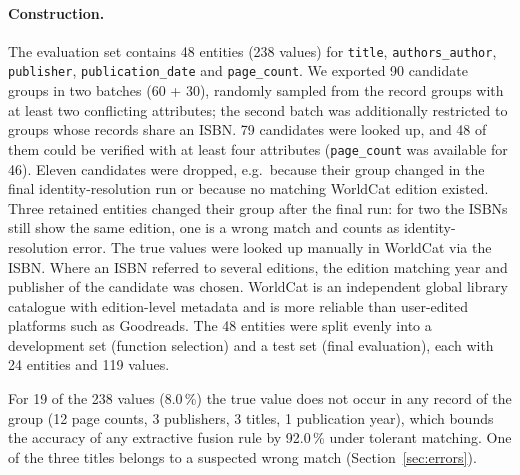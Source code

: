 \documentclass[a4paper,11pt]{article}
\begin{document}
\paragraph{Construction.}
The evaluation set contains 48 entities (238 values) for \texttt{title},
\texttt{authors\_author}, \texttt{publisher}, \texttt{publication\_date} and
\texttt{page\_count}. We exported 90 candidate groups in two batches (60 + 30),
randomly sampled from the record groups with at least two conflicting attributes;
the second batch was additionally restricted to groups whose records share an
ISBN. %
79 candidates were looked up, and 48 of them could be verified with at least four
attributes (\texttt{page\_count} was available for 46). Eleven candidates were
dropped, e.g.\ because their group changed in the final identity-resolution run or
because no matching WorldCat edition existed. Three retained entities
changed their group after the final run: for two the ISBNs still show the same
edition, one is a wrong match and counts as identity-resolution error.
The true values were looked up manually in WorldCat via the ISBN. %
Where an ISBN referred to several editions, the edition matching year and
publisher of the candidate was chosen.
WorldCat is an independent global library catalogue with edition-level metadata and
is more reliable than user-edited platforms such as Goodreads. The 48 entities
were split evenly into a development set (function selection) and a test set
(final evaluation), each with 24 entities and 119 values.


For 19 of the 238 values (8.0\,\%) the true value does not occur in any record of
the group (12 page counts, 3 publishers, 3 titles, 1 publication year), which
bounds the accuracy of any extractive fusion rule by 92.0\,\% under tolerant
matching. One of the three titles belongs to a suspected wrong match
(Section~\ref{sec:errors}).


\end{document}
